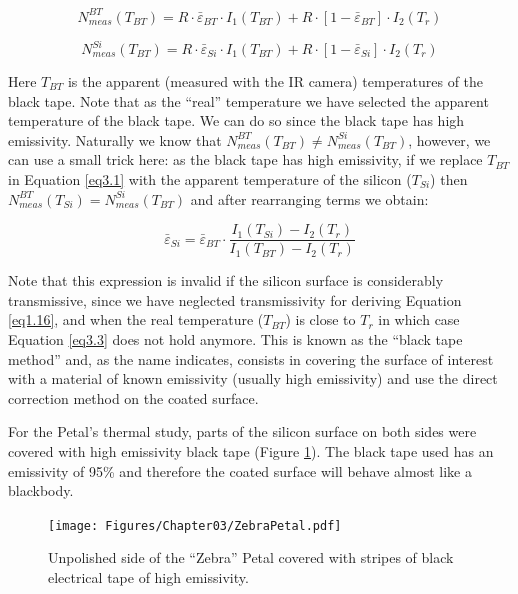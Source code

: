 		\begin{equation}\label{eq3.1}
			N^{BT}_{meas}(T_{BT})= R \cdot \bar{\varepsilon}_{BT} \cdot I_{1}(T_{BT}) + R \cdot [1- \bar{\varepsilon}_{BT}] \cdot I_{2}(T_{r})
		\end{equation}
			
		\begin{equation}\label{eq3.2}
			N^{Si}_{meas}(T_{BT})= R \cdot \bar{\varepsilon}_{Si} \cdot I_{1}(T_{BT}) + R \cdot [1- \bar{\varepsilon}_{Si}] \cdot I_{2}(T_{r})
		\end{equation}\bigskip
	
		Here $T_{BT}$ is the apparent (measured with the IR camera) temperatures of the black tape. Note that as the “real” temperature we have selected the apparent temperature of the black tape. We can do so since the black tape has high emissivity. Naturally we know that $N^{BT}_{meas}(T_{BT}) \neq N^{Si}_{meas}(T_{BT})$, however, we can use a small trick here: as the black tape has high emissivity, if we replace $T_{BT}$ in Equation \ref{eq3.1} with the apparent temperature of the silicon ($T_{Si}$) then $N^{BT}_{meas}(T_{Si}) = N^{Si}_{meas}(T_{BT})$ and after rearranging terms we obtain:
		
		\begin{equation}\label{eq3.3}
			\bar{\varepsilon}_{Si} = \bar{\varepsilon}_{BT} \cdot \frac{I_{1}(T_{Si}) - I_{2}(T_{r})}{I_{1}(T_{BT}) - I_{2}(T_{r})}
		\end{equation}\bigskip
	
		Note that this expression is invalid if the silicon surface is considerably transmissive, since we have neglected transmissivity for deriving Equation \ref{eq1.16}, and when the real temperature ($T_{BT}$) is close to $T_{r}$ in which case Equation \ref{eq3.3} does not hold anymore. This is known as the “black tape method” and, as the name indicates, consists in covering the surface of interest with a material of known emissivity (usually high emissivity) and use the direct correction method on the coated surface.
		
		For the Petal’s thermal study, parts of the silicon surface on both sides were covered with high emissivity black tape (Figure \ref{fig3.2}). The black tape used has an emissivity of 95\% and therefore the coated surface will behave almost like a blackbody. 
	
		\begin{figure}[ht!]
			\centering
			\captionsetup{justification=centering,margin=2cm}
			\texttt{[image: Figures/Chapter03/ZebraPetal.pdf]}
			\caption{Unpolished side of the “Zebra” Petal covered with stripes of black electrical tape of high emissivity.}\label{fig3.2}
		\end{figure}
	
